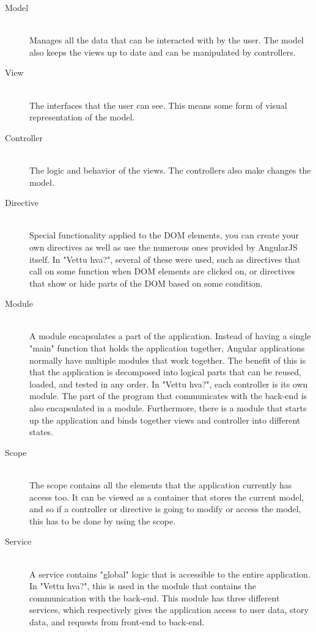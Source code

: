 \begin{description}
	\item[Model] \hfill \\ 
	Manages all the data that can be interacted with by the user. The model also keeps the views up to date and can be manipulated by controllers.
	
	\item[View] \hfill \\ 
	The interfaces that the user can see. This means some form of visual representation of the model.
	
	\item[Controller] \hfill \\ 
	The logic and behavior of the views. The controllers also make changes the model.
	
	\item[Directive] \hfill \\ 
	Special functionality applied to the DOM elements, you can create your own directives as well as use the numerous ones provided by AngularJS itself. In "Vettu hva?", several of these were used, such as directives that call on some function when DOM elements are clicked on, or directives that show or hide parts of the DOM based on some condition.
	
	\item[Module] \hfill \\ 
	A module encapsulates a part of the application. Instead of having a single "main" function that holds the application together, Angular applications normally have multiple modules that work together. The benefit of this is that the application is decomposed into logical parts that can be reused, loaded, and tested in any order. In "Vettu hva?", each controller is its own module. The part of the program that communicates with the back-end is also encapsulated in a module. Furthermore, there is a module that starts up the application and binds together views and controller into different states.
	
	\item[Scope] \hfill \\ 
	The scope contains all the elements that the application currently has access too. It can be viewed as a container that stores the current model, and so if a controller or directive is going to modify or access the model, this has to be done by using the scope.
	
	\item[Service] \hfill \\ 
	A service contains "global" logic that is accessible to the entire application. In "Vettu hva?", this is used in the module that contains the communication with the back-end. This module has three different services, which respectively gives the application access to user data, story data, and requests from front-end to back-end.
\end{description}

